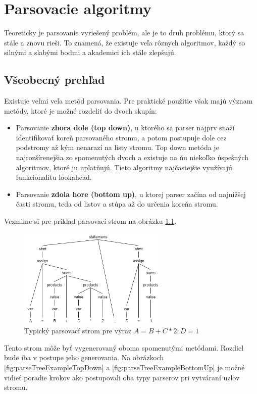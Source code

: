 \chapter{Parsovacie algoritmy}
Teoreticky je parsovanie vyriešený problém, ale je to druh problému, ktorý sa stále a znovu rieši. To znamená, že existuje veľa rôznych algoritmov, každý so silnými a slabými bodmi a akademici ich stále zlepšujú.\cite{tomassetti:parsing}

\section{Všeobecný prehľad}\label{parsing-alg-basics}
Existuje veľmi veľa metód parsovania. Pre praktické použitie však majú význam metódy, ktoré je možné rozdeliť do dvoch skupín:\cite{CVUT:program_language}
\begin{itemize}
\item Parsovanie \textbf{zhora dole (top down)}, u ktorého sa parser najprv snaží identifikovať koreň parsovaného stromu, a potom postupuje dole cez podstromy až kým nenarazí na listy stromu. Top down metóda je najrozšírenejšia zo spomenutých dvoch a existuje na ňu niekoľko úspešných algoritmov, ktoré ju uplatňujú. Tieto algoritmy najčastejšie využívajú funkcionalitu lookahead.
\item Parsovanie \textbf{zdola hore (bottom up)}, u ktorej parser začína od najnižšej časti stromu, teda od listov a stúpa až do určenia koreňa stromu. 
\end{itemize}

Vezmime si pre príklad parsovací strom na obrázku \ref{fig:parseTreeExample}. 
\begin{figure}[H]
\begin{center}
\includegraphics[width=7cm]{figures/parseTreeExample.png}
\caption{Typický parsovací strom pre výraz $A = B + C*2;  D = 1$}
\label{fig:parseTreeExample}
\end{center}
\end{figure}

Tento strom môže byť vygenerovaný oboma spomenutými metódami. Rozdiel bude iba v postupe jeho generovania. Na obrázkoch \ref{fig:parseTreeExampleTopDown} a \ref{fig:parseTreeExampleBottomUp} je možné vidieť poradie krokov ako postupovali oba typy parserov pri vytváraní uzlov stromu.

